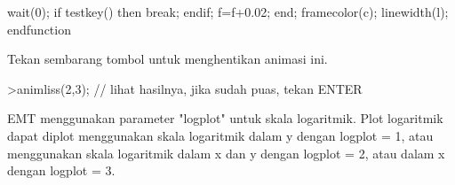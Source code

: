 \documentclass[a4paper,10pt]{article}
\begin{document}
\begin{eulernotebook}
\begin{eulercomment}
\begin{eulercomment}
\begin{eulerudf}
    wait(0);
    if testkey() then break; endif;
    f=f+0.02;
  end;
  framecolor(c);
  linewidth(l);
  endfunction
\end{eulerudf}
\begin{eulercomment}
Tekan sembarang tombol untuk menghentikan animasi ini.
\end{eulercomment}
\begin{eulerprompt}
>animliss(2,3); // lihat hasilnya, jika sudah puas, tekan ENTER
\end{eulerprompt}
\begin{eulercomment}
EMT menggunakan parameter "logplot" untuk skala logaritmik. Plot
logaritmik dapat diplot menggunakan skala logaritmik dalam y dengan
logplot = 1, atau menggunakan skala logaritmik dalam x dan y dengan
logplot = 2, atau dalam x dengan logplot = 3. 


\end{eulercomment}
\end{eulercomment}
\end{eulercomment}
\end{eulernotebook}
\end{document}
